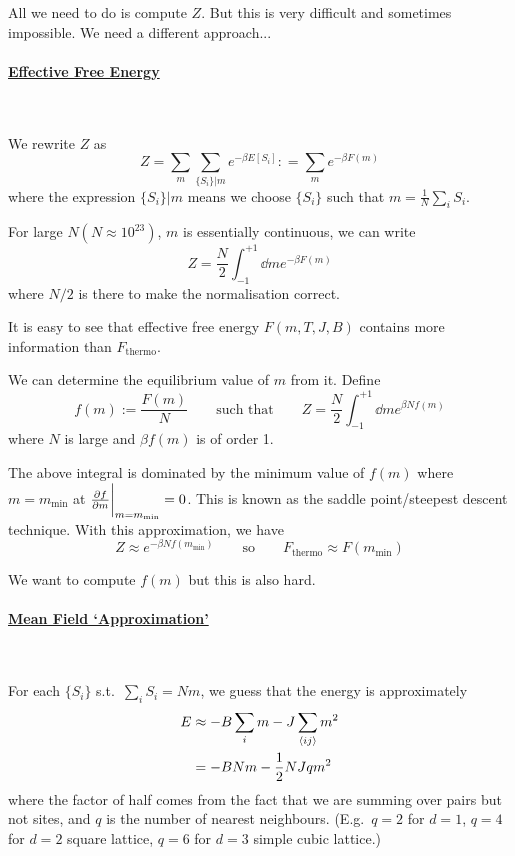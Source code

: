 \documentclass[a4paper,11pt]{article}
\begin{document}
	All we need to do is compute $Z$. But this is very difficult and sometimes impossible. We need a different approach... 

	\paragraph{\underline{Effective Free Energy}} \ 

	We rewrite $Z$ as
	\[
		Z = \sum_m \sum_{\{S_i\}|m} e^{-\beta E[S_i]} : = \sum_m e^{-\beta F(m)}
	\]
	where the expression $\{S_i\} | m$ means we choose $\{S_i\}$ such that $m = \frac{1}{N} \sum_i S_i$.

	For large $N ( N \approx 10^{23})$, $m$ is essentially continuous, we can write
	\[
		Z = \frac{N}{2} \int_{-1}^{+1} \dd{m} e^{-\beta F(m)}
	\]
	where $N/2$ is there to make the normalisation correct.

	It is easy to see that effective free energy $F(m,T,J,B)$ contains more information than $F_{\text{thermo}}$.

	We can determine the equilibrium value of $m$ from it. Define 
	\[
		f(m):= \frac{F(m)}{N} \qquad \text{such that} \qquad Z = \frac{N}{2} \int_{-1}^{+1} \dd{m} e^{\beta N f(m)}
	\]
	where $N$ is large and $\beta f(m)$ is of order 1.

	The above integral is dominated by the minimum value of $f(m)$ where $m = m_{\text{min}}$ at $\pdv{f}{m}\bigg|_{m = m_{\text{min}}} = 0$. This is known as the saddle point/steepest descent technique. With this approximation, we have
	\[
		Z \approx e^{-\beta N f(m_{\text{min}})} \qquad \text{so} \qquad F_{\text{thermo}} \approx F(m_{\text{min}})
	\]
	
	We want to compute $f(m)$ but this is also hard.

	\paragraph{\underline{Mean Field `Approximation'}} \ 

	For each $\{S_i\}$ s.t.\ $\sum_i S_i = Nm$, we guess that the energy is approximately
	\begin{align*}
		E & \approx - B \sum_i m - J \sum_{\expval{ij}} m^2\\
		& = - B N m - \frac{1}{2} N J q m^2
	\end{align*}
	where the factor of half comes from the fact that we are summing over pairs but not sites, and $q$ is the number of nearest neighbours. (E.g.\ $q=2$ for $d=1$, $q=4$ for $d=2$ square lattice, $q=6$ for $d=3$ simple cubic lattice.)
\end{document}
